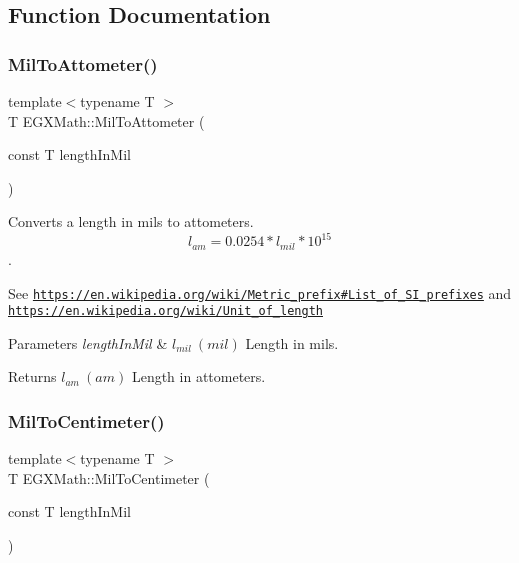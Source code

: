 \subsection{Function Documentation}
\mbox{\label{group___e_g_x_math-_conversions-_length_conversions-_imperial-_mil-_s_i_ga73766988fce0feea206c432f3237e5c6}} 
\subsubsection{\texorpdfstring{Mil\+To\+Attometer()}{MilToAttometer()}}
{\footnotesize\ttfamily template$<$typename T $>$ \\
T E\+G\+X\+Math\+::\+Mil\+To\+Attometer (\begin{DoxyParamCaption}\item[{const T}]{length\+In\+Mil }\end{DoxyParamCaption})}



Converts a length in mils to attometers. \[ l_{am}=0.0254* l_{mil} * 10^{15} \]. 

See \href{https://en.wikipedia.org/wiki/Metric_prefix#List_of_SI_prefixes}{\tt https\+://en.\+wikipedia.\+org/wiki/\+Metric\+\_\+prefix\#\+List\+\_\+of\+\_\+\+S\+I\+\_\+prefixes} and \href{https://en.wikipedia.org/wiki/Unit_of_length}{\tt https\+://en.\+wikipedia.\+org/wiki/\+Unit\+\_\+of\+\_\+length} 
\begin{DoxyParams}{Parameters}
{\em length\+In\+Mil} & $ l_{mil}\ (mil)$ Length in mils. \\
\hline
\end{DoxyParams}
\begin{DoxyReturn}{Returns}
$ l_{am}\ (am)$ Length in attometers. 
\end{DoxyReturn}
\mbox{\label{group___e_g_x_math-_conversions-_length_conversions-_imperial-_mil-_s_i_ga8356e73011f6f7eb1df5e3dda75d7e28}} 
\subsubsection{\texorpdfstring{Mil\+To\+Centimeter()}{MilToCentimeter()}}
{\footnotesize\ttfamily template$<$typename T $>$ \\
T E\+G\+X\+Math\+::\+Mil\+To\+Centimeter (\begin{DoxyParamCaption}\item[{const T}]{length\+In\+Mil }\end{DoxyParamCaption})}



